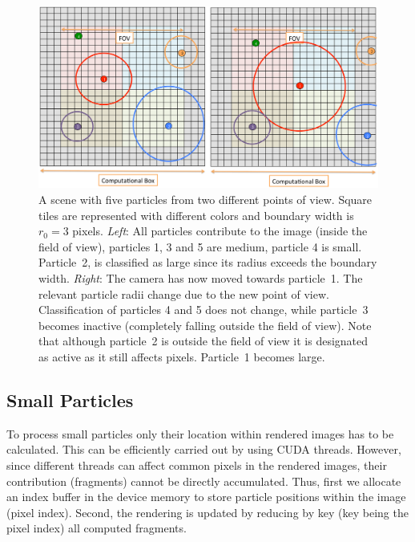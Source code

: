 \documentclass[preprint,5pt]{elsarticle}
\begin{document}
\begin{figure}
\includegraphics[scale=0.14]{fov.eps}
\caption{A scene with five particles from two different points of view. Square tiles are
represented with different colors and boundary width is $r_0=3$ pixels. {\em Left}: All particles contribute to the image (inside the field of view), particles 1, 3 and 5
are medium, particle 4 is small. Particle~2, is classified as large since its radius exceeds the boundary width. {\em Right}: The camera has now moved towards particle~1. The relevant particle radii change due to the new point
of view. Classification of particles 4 and 5 does not change, while particle~3
becomes inactive (completely falling outside the field of view). Note that although particle~2 is outside the field of view it is designated as active as it still affects pixels.
Particle~1 becomes large.
}
\label{fig:fov}
\end{figure}

\subsection{Small Particles}
\label{sec:smallparticles}
To process small particles only their location within rendered images has to be calculated. This can be efficiently carried out by using CUDA threads. However, since different threads can affect common pixels in the rendered images, their contribution (fragments) cannot be directly accumulated. Thus, first we allocate an index buffer in the device memory to store particle positions within the image (pixel index). Second, the rendering is updated by reducing by key (key being the pixel index) all computed fragments.
\end{document}
